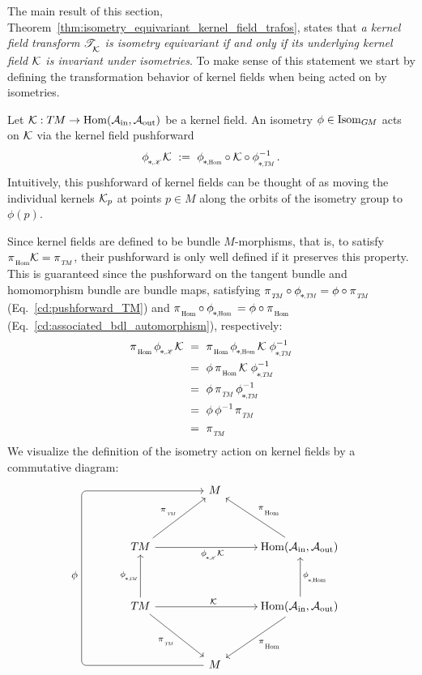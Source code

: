 The main result of this section, Theorem~\ref{thm:isometry_equivariant_kernel_field_trafos}, states that \emph{a kernel field transform $\mathscr{T}_{\overset{}{\mkern-0mu \mathcal{K}}}$ is isometry equivariant if and only if its underlying kernel field $\mathcal{K}$ is invariant under isometries}.
To make sense of this statement we start by defining the transformation behavior of kernel fields when being acted on by isometries.
\begin{dfn}
\label{dfn:isometry_action_kernel_fields}
    Let $\mathcal{K}: T\mkern-1.5muM \to \operatorname{Hom}(\mathcal{A}_\textup{in},\mathcal{A}_\textup{out})$ be a kernel field.
    An isometry $\phi \in \operatorname{Isom}_{G\mkern-1.4muM}$ acts on $\mathcal{K}$ via the kernel field pushforward
    \begin{align}\label{eq:kernel_constraint_isom_full_1}
        \dphiK \K\ :=\ \dphiHom \!\circ \K \circ \dphiTMinv \,.
    \end{align}
    Intuitively, this pushforward of kernel fields can be thought of as moving the individual kernels $\mathcal{K}_p$ at points $p\in M$ along the orbits of the isometry group to $\phi(p)$.
\end{dfn}
Since kernel fields are defined to be bundle $M$-morphisms, that is, to satisfy $\piHom \K = \piTM$, their pushforward is only well defined if it preserves this property.
This is guaranteed since the pushforward on the tangent bundle and homomorphism bundle are bundle maps, satisfying $\piTM \circ \dphiTM = \phi \circ \piTM$ (Eq.~\eqref{cd:pushforward_TM}) and ${\piHom \circ \dphiHom = \phi \circ \piHom}$ (Eq.~\eqref{cd:associated_bdl_automorphism}), respectively:
\begin{align}
    \piHom\, \dphiK \K
    \ &=\ \piHom\, \dphiHom \K\; \dphiTMinv \notag \\
    \ &=\ \phi\, \piHom\, \K\; \dphiTMinv \notag \\
    \ &=\ \phi\, \piTM\, \dphiTMinv \notag \\
    \ &=\ \phi\, \phiinv\, \piTM \notag \\
    \ &=\ \piTM
\end{align}
We visualize the definition of the isometry action on kernel fields by a commutative diagram:
\begin{equation}
    \begin{tikzcd}[row sep=3.5em, column sep=2.8em]
        &[3.5ex] M & \\
        \TM  \arrow[ru, "\piTM"]
            \arrow[rr, pos=.56, "\dphiK \K"']
        & &
        \mkern-3mu
        \Hom(\Ain,\Aout)
            \arrow[lu, "\piHom"']
        \\
        \TM  \arrow[rd, "\piTM"']
            \arrow[rr, pos=.57, "\K"]
            \arrow[u, "\dphiTM"]
        & &
        \mkern-3mu
        \Hom(\Ain,\Aout)
            \arrow[ld, "\piHom"]
            \arrow[u, "\dphiHom"']
        \\
        & M 
            \arrow[uuu, rounded corners, to path={ 
                    -- ([xshift=-25ex]\tikztostart.west) 
                    --node[left, pos=.515]{\small$\phi$} ([xshift=-25ex]\tikztotarget.west) 
                    -- (\tikztotarget.west)
                    }]
        &
    \end{tikzcd}
    \quad
\end{equation}
